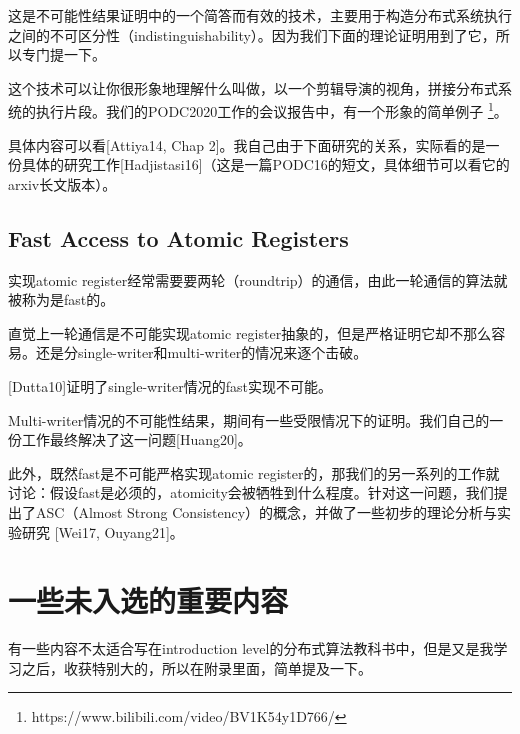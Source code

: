 \documentclass[UTF8]{ctexrep}
\begin{document}
这是不可能性结果证明中的一个简答而有效的技术，主要用于构造分布式系统执行之间的不可区分性（indistinguishability）。因为我们下面的理论证明用到了它，所以专门提一下。

这个技术可以让你很形象地理解什么叫做，以一个剪辑导演的视角，拼接分布式系统的执行片段。我们的PODC2020工作的会议报告中，有一个形象的简单例子 \footnote{https://www.bilibili.com/video/BV1K54y1D766/}。

具体内容可以看[Attiya14, Chap 2]。我自己由于下面研究的关系，实际看的是一份具体的研究工作[Hadjistasi16]（这是一篇PODC16的短文，具体细节可以看它的arxiv长文版本）。

\section{Fast Access to Atomic Registers}

实现atomic register经常需要要两轮（roundtrip）的通信，由此一轮通信的算法就被称为是fast的。

直觉上一轮通信是不可能实现atomic register抽象的，但是严格证明它却不那么容易。还是分single-writer和multi-writer的情况来逐个击破。

[Dutta10]证明了single-writer情况的fast实现不可能。

Multi-writer情况的不可能性结果，期间有一些受限情况下的证明。我们自己的一份工作最终解决了这一问题[Huang20]。

此外，既然fast是不可能严格实现atomic register的，那我们的另一系列的工作就讨论：假设fast是必须的，atomicity会被牺牲到什么程度。针对这一问题，我们提出了ASC（Almost Strong Consistency）的概念，并做了一些初步的理论分析与实验研究 [Wei17, Ouyang21]。

\appendix

\chapter{一些未入选的重要内容}

有一些内容不太适合写在introduction level的分布式算法教科书中，但是又是我学习之后，收获特别大的，所以在附录里面，简单提及一下。
\end{document}

